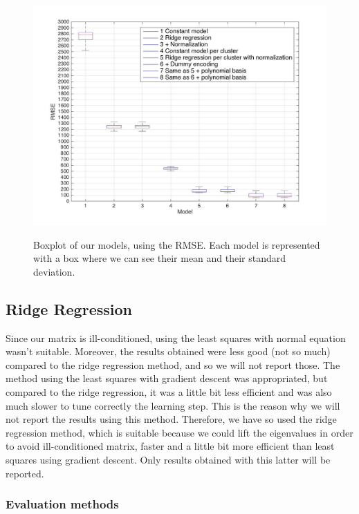 \documentclass{article} %
\begin{document}
\begin{figure}[!ht]
\hfill
\includegraphics[width=6in]{figures/models.jpg} \label{fig:models}
\caption{Boxplot of our models, using the RMSE. Each model is represented with a box where we can see their mean and their standard deviation.}
\caption{}
\end{figure}

\subsection{Ridge Regression}

Since our matrix is ill-conditioned, using the least squares with normal equation wasn't suitable. Moreover, the results obtained were less good (not so much) compared to the ridge regression method, and so we will not report those. The method using the least squares with gradient descent was appropriated, but compared to the ridge regression, it was a little bit less efficient and was also much slower to tune correctly the learning step. This is the reason why we will not report the results using this method. Therefore, we have so used the ridge regression method, which is suitable because we could lift the eigenvalues in order to avoid ill-conditioned matrix, faster and a little bit more efficient than least squares using gradient descent. Only results obtained with this latter will be reported.

\subsubsection{Evaluation methods}
\end{document}
